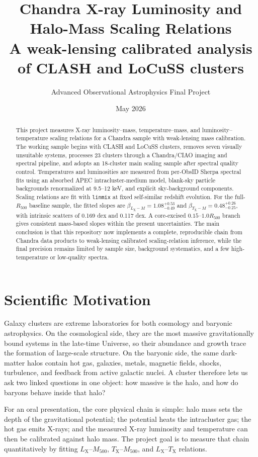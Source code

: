 \documentclass[11pt]{article}
\title{\textbf{Chandra X-ray Luminosity and Halo-Mass Scaling Relations}\\
\large A weak-lensing calibrated analysis of CLASH and LoCuSS clusters}
\author{Advanced Observational Astrophysics Final Project}
\date{May 2026}
\newcommand{\Mfive}{\ensuremath{M_{500}}}
\newcommand{\Rfive}{\ensuremath{R_{500}}}
\newcommand{\Lx}{\ensuremath{L_{\mathrm{X}}}}
\newcommand{\Tx}{\ensuremath{T_{\mathrm{X}}}}
\begin{document}
\maketitle

\begin{abstract}
This project measures X-ray luminosity--mass, temperature--mass, and luminosity--temperature scaling relations for a Chandra sample with weak-lensing mass calibration. The working sample begins with CLASH and LoCuSS clusters, removes seven visually unsuitable systems, processes 23 clusters through a Chandra/CIAO imaging and spectral pipeline, and adopts an 18-cluster main scaling sample after spectral quality control. Temperatures and luminosities are measured from per-ObsID Sherpa spectral fits using an absorbed APEC intracluster-medium model, blank-sky particle backgrounds renormalized at 9.5--12 keV, and explicit sky-background components. Scaling relations are fit with \texttt{linmix} at fixed self-similar redshift evolution. For the full-\Rfive{} baseline sample, the fitted slopes are $\beta_{\Lx-M}=1.08^{+0.53}_{-0.49}$ and $\beta_{\Tx-M}=0.48^{+0.26}_{-0.25}$, with intrinsic scatters of 0.169 dex and 0.117 dex. A core-excised $0.15$--$1.0\Rfive$ branch gives consistent mass-based slopes within the present uncertainties. The main conclusion is that this repository now implements a complete, reproducible chain from Chandra data products to weak-lensing calibrated scaling-relation inference, while the final precision remains limited by sample size, background systematics, and a few high-temperature or low-quality spectra.
\end{abstract}

\section{Scientific Motivation}

Galaxy clusters are extreme laboratories for both cosmology and baryonic astrophysics. On the cosmological side, they are the most massive gravitationally bound systems in the late-time Universe, so their abundance and growth trace the formation of large-scale structure. On the baryonic side, the same dark-matter halos contain hot gas, galaxies, metals, magnetic fields, shocks, turbulence, and feedback from active galactic nuclei. A cluster therefore lets us ask two linked questions in one object: how massive is the halo, and how do baryons behave inside that halo?

For an oral presentation, the core physical chain is simple: halo mass sets the depth of the gravitational potential; the potential heats the intracluster gas; the hot gas emits X-rays; and the measured X-ray luminosity and temperature can then be calibrated against halo mass. The project goal is to measure that chain quantitatively by fitting \Lx--\Mfive{}, \Tx--\Mfive{}, and \Lx--\Tx{} relations.
\end{document}
